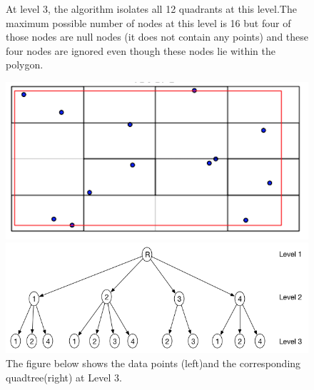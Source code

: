 \documentclass{article}
\begin{document}
\begin{figure}[ht]


At level 3, the algorithm  isolates all 12 quadrants at this level.The maximum possible number of nodes at this level is 16 but four of  those nodes are null nodes (it does not contain any points) and these four nodes are ignored even though these nodes lie within the polygon.

  \centering
  \begin{minipage}[b]{0.35\textwidth}
    \includegraphics[width=\textwidth]{4Quad1_3}  
  \end{minipage}
  \hfill
  \begin{minipage}[b]{0.6\textwidth}
    \includegraphics[width=\textwidth]{1_1Quad_3_tree}
  \end{minipage}
  \caption{The figure below shows the data points (left)and the corresponding quadtree(right) at Level 3.}
\end{figure}

\vspace{2cm}
\end{document}
